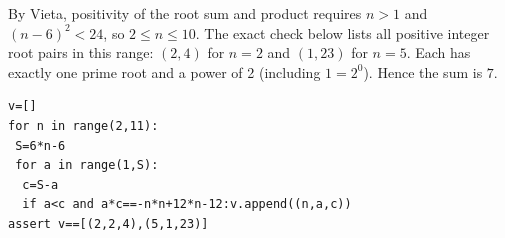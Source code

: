 By Vieta, positivity of the root sum and product requires $n>1$ and $(n-6)^2<24$, so $2\le n\le10$. The exact check below lists all positive integer root pairs in this range: $(2,4)$ for $n=2$ and $(1,23)$ for $n=5$. Each has exactly one prime root and a power of 2 (including $1=2^0$). Hence the sum is $\boxed7$.
\begin{verbatim}
v=[]
for n in range(2,11):
 S=6*n-6
 for a in range(1,S):
  c=S-a
  if a<c and a*c==-n*n+12*n-12:v.append((n,a,c))
assert v==[(2,2,4),(5,1,23)]
\end{verbatim}
